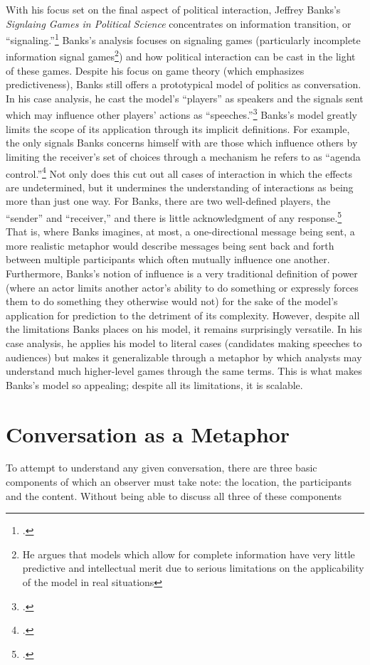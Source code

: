 \documentclass[letterpaper,12pt]{article}
\begin{document}
With his focus set on the final aspect of political interaction, Jeffrey Banks's \emph{Signlaing Games in Political Science} concentrates on information transition, or ``signaling.''\footcite{banks91} 
Banks's analysis focuses on signaling games (particularly incomplete information signal games\footnote{He argues that models which allow for complete information have very little predictive and intellectual merit due to serious limitations on the applicability of the model in real situations}) and how political interaction can be cast in the light of these games. 
Despite his focus on game theory (which emphasizes predictiveness), Banks still offers a prototypical model of politics as conversation. 
In his case analysis, he cast the model's ``players'' as speakers and the signals sent which may influence other players' actions as ``speeches.''\footcite[37]{banks91} 
Banks's model greatly limits the scope of its application through its implicit definitions. 
For example, the only signals Banks concerns himself with are those which influence others by limiting the receiver's set of choices through a mechanism he refers to as ``agenda control.''\footcite[3]{banks91} 
Not only does this cut out all cases of interaction in which the effects are undetermined, but it undermines the understanding of interactions as being more than just one way. 
For Banks, there are two well-defined players, the ``sender'' and ``receiver,'' and there is little acknowledgment of any response.\footcite[4]{banks91} 
That is, where Banks imagines, at most, a one-directional message being sent, a more realistic metaphor would describe messages being sent back and forth between multiple participants which often mutually influence one another. 
Furthermore, Banks's notion of influence is a very traditional definition of power (where an actor limits another actor's ability to do something or expressly forces them to do something they otherwise would not) for the sake of the model's application for prediction to the detriment of its complexity. 
However, despite all the limitations Banks places on his model, it remains surprisingly versatile. 
In his case analysis, he applies his model to literal cases (candidates making speeches to audiences) but makes it generalizable through a metaphor by which analysts may understand much higher-level games through the same terms. 
This is what makes Banks's model so appealing; despite all its limitations, it is scalable.
\section{Conversation as a Metaphor}
To attempt to understand any given conversation, there are three basic components of which an observer must take note: the location, the participants and the content. 
Without being able to discuss all three of these components
\newpage
\printbibliography
\end{document}
